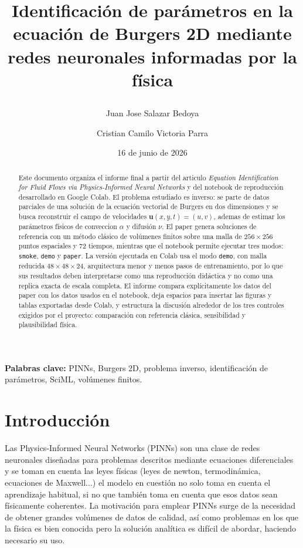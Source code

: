\documentclass[10pt,letterpaper,twocolumn]{article}
\title{\textbf{Identificación de parámetros en la ecuación de Burgers 2D mediante redes neuronales informadas por la física}\\

\author{Juan Jose Salazar Bedoya \and Cristian Camilo Victoria Parra}}
\date{16 de junio de 2026}
\begin{document}
\maketitle

\begin{abstract}
Este documento organiza el informe final a partir del articulo \textit{Equation Identification for Fluid Flows via Physics-Informed Neural Networks} y del notebook de reproducción desarrollado en Google Colab. El problema estudiado es inverso: se parte de datos parciales de una solución de la ecuación vectorial de Burgers en dos dimensiones y se busca reconstruir el campo de velocidades $\mathbf{u}(x,y,t)=(u,v)$, ademas de estimar los parámetros físicos de conveccion $\alpha$ y difusión $\nu$. El paper genera soluciones de referencia con un método clásico de volúmenes finitos sobre una malla de $256\times 256$ puntos espaciales y $72$ tiempos, mientras que el notebook permite ejecutar tres modos: \texttt{smoke}, \texttt{demo} y \texttt{paper}. La versión ejecutada en Colab usa el modo \texttt{demo}, con malla reducida $48\times48\times24$, arquitectura menor y menos pasos de entrenamiento, por lo que sus resultados deben interpretarse como una reproducción didáctica y no como una replica exacta de escala completa. El informe compara explícitamente los datos del paper con los datos usados en el notebook, deja espacios para insertar las figuras y tablas exportadas desde Colab, y estructura la discusión alrededor de los tres controles exigidos por el proyecto: comparación con referencia clásica, sensibilidad y plausibilidad física.
\end{abstract}

\textbf{Palabras clave:} PINNs, Burgers 2D, problema inverso, identificación de parámetros, SciML, volúmenes finitos.

\section{Introducción}

Las Physics-Informed Neural Networks (PINNs) son una clase de redes neuronales diseñadas para problemas descritos mediante ecuaciones diferenciales y se toman en cuenta las leyes físicas (leyes de newton, termodinámica, ecuaciones de Maxwell...) el modelo en cuestión no solo toma en cuenta el aprendizaje habitual, si no que también toma en cuenta que esos datos sean físicamente coherentes. La motivación para emplear PINNs surge de la necesidad de obtener grandes volúmenes de datos de calidad, así como problemas en los que la física es bien conocida pero la solución analítica es difícil de abordar, haciendo necesario su uso.\\
\end{document}
